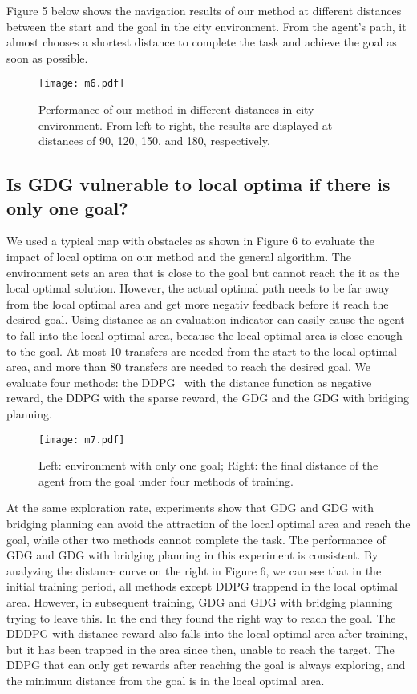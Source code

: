 \documentclass[8pt,twoside,a4paper]{article}
\begin{document}
\par Figure 5 below shows the navigation results of our method at different distances between the start and the goal in the city environment. From the agent's path, it almost chooses a shortest distance to complete the task and achieve the goal as soon as possible.

\begin{figure}[htb]
\centering
{\texttt{[image: m6.pdf]}
\label{5}}
\caption{Performance of our method in different distances in city environment. From left to right, the results are displayed at distances of 90, 120, 150, and 180, respectively.}
\end{figure}

\subsection{Is GDG vulnerable to local optima if there is only one goal?}
We used a typical map with obstacles as shown in Figure 6 to evaluate the impact of local optima on our method and the general algorithm. The environment sets an area that is close to the goal but cannot reach the it as the local optimal solution. However, the actual optimal path needs to be far away from the local optimal area and get more negativ feedback before it reach the desired goal. Using distance as an evaluation indicator can easily cause the agent to fall into the local optimal area, because the local optimal area is close enough to the goal. At most 10 transfers are needed from the start to the local optimal area, and more than 80 transfers are needed to reach the desired goal. We evaluate four methods: the DDPG~\cite{lillicrap2016continuous} with the distance function as negative reward, the DDPG with the sparse reward, the GDG and the GDG with bridging planning. 
\begin{figure}[h]
\centering
{\texttt{[image: m7.pdf]}
\label{7}}
\caption{Left: environment with only one goal; Right: the final distance of the agent from the goal under four methods of training.}
\end{figure}

\par At the same exploration rate, experiments show that GDG and GDG with bridging planning can avoid the attraction of the local optimal area and reach the goal, while other two methods cannot complete the task. The performance of GDG and GDG with bridging planning in this experiment is consistent. By analyzing the distance curve on the right in Figure 6, we can see that in the initial training period, all methods except DDPG trappend in the local optimal area. However, in subsequent training, GDG and GDG with bridging planning trying to leave this. In the end they found the right way to reach the goal. The DDDPG with distance reward also falls into the local optimal area after training, but it has been trapped in the area since then, unable to reach the target. The DDPG that can only get rewards after reaching the goal is always exploring, and the minimum distance from the goal is in the local optimal area.
\end{document}
